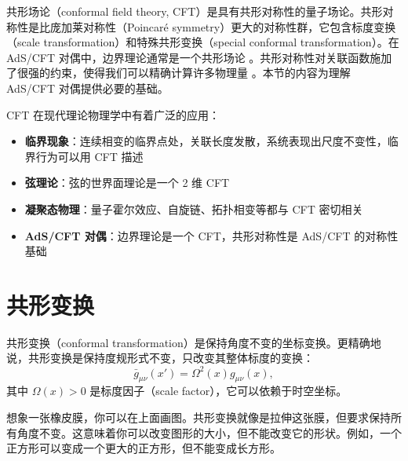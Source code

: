 
共形场论（conformal field theory, CFT）是具有共形对称性的量子场论。共形对称性是比庞加莱对称性（Poincaré symmetry）更大的对称性群，它包含标度变换（scale transformation）和特殊共形变换（special conformal transformation）。在 AdS/CFT 对偶中，边界理论通常是一个共形场论 \cite{Maldacena1997}。共形对称性对关联函数施加了很强的约束，使得我们可以精确计算许多物理量 \cite{Aharony1999}。本节的内容为理解 AdS/CFT 对偶提供必要的基础。

\begin{note}
CFT 在现代理论物理学中有着广泛的应用：
\begin{itemize}
    \item \textbf{临界现象}：连续相变的临界点处，关联长度发散，系统表现出尺度不变性，临界行为可以用 CFT 描述
    \item \textbf{弦理论}：弦的世界面理论是一个 2 维 CFT \cite{Polchinski1998}
    \item \textbf{凝聚态物理}：量子霍尔效应、自旋链、拓扑相变等都与 CFT 密切相关
    \item \textbf{AdS/CFT 对偶}：边界理论是一个 CFT，共形对称性是 AdS/CFT 的对称性基础 \cite{Maldacena1997}
\end{itemize}
\end{note}

\section{共形变换}

\begin{definition}[共形变换]
共形变换（conformal transformation）是保持角度不变的坐标变换。更精确地说，共形变换是保持度规形式不变，只改变其整体标度的变换：
\begin{equation}
    \bar{g}_{\mu\nu}(x') = \Omega^2(x) g_{\mu\nu}(x),
\end{equation}
其中 $\Omega(x) > 0$ 是标度因子（scale factor），它可以依赖于时空坐标。
\end{definition}

\begin{note}[直观理解]
想象一张橡皮膜，你可以在上面画图。共形变换就像是拉伸这张膜，但要求保持所有角度不变。这意味着你可以改变图形的大小，但不能改变它的形状。例如，一个正方形可以变成一个更大的正方形，但不能变成长方形。
\end{note}

